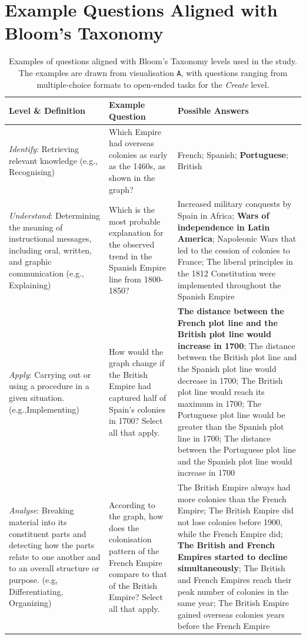 \newpage
\appendix
\onecolumn

\section{Example Questions Aligned with Bloom's Taxonomy}
\label{sec:appendix-questions}

\begin{table}[h!]
\centering
\small
\caption{Examples of questions aligned with Bloom's Taxonomy levels used in the study. The examples are drawn from visualisation \texttt{A}, with questions ranging from multiple-choice formats to open-ended tasks for the \textit{Create} level.}
\begin{tabular}{p{3.4cm}p{4.4cm}p{6.5cm}}
\toprule
\textbf{Level \& Definition} & \textbf{Example Question} & \textbf{Possible Answers} \\ 
\midrule
\textit{Identify}: Retrieving relevant knowledge (e.g., Recognising) &Which Empire had overseas colonies as early as the 1460s, as shown in the graph? & French; Spanish; \textbf{Portuguese}; British \\ 
\midrule
\textit{Understand}: Determining the meaning of instructional messages, including oral, written, and graphic communication (e.g., Explaining) & Which is the most probable explanation for the observed trend in the Spanish Empire line from 1800-1850? & Increased military conquests by Spain in Africa; \textbf{Wars of independence in Latin America}; Napoleonic Wars that led to the cession of colonies to France; The liberal principles in the 1812 Constitution were implemented throughout the Spanish Empire \\ 
\midrule
\textit{Apply}: Carrying out or using a procedure in a given situation. (e.g.,Implementing) & How would the graph change if the British Empire had captured half of Spain's colonies in 1700? Select all that apply. & \textbf{The distance between the French plot line and the British plot line would increase in 1700}; The distance between the British plot line and the Spanish plot line would decrease in 1700; The British plot line would reach its maximum in 1700; The Portuguese plot line would be greater than the Spanish plot line in 1700; The distance between the Portuguese plot line and the Spanish plot line would increase in 1700 \\ 
\midrule
\textit{Analyse}: Breaking material into its constituent parts and detecting how the parts relate to one another and to an overall structure or purpose. (e.g, Differentiating, Organizing)&According to the graph, how does the colonisation pattern of the French Empire compare to that of the British Empire? Select all that apply. & The British Empire always had more colonies than the French Empire; The British Empire did not lose colonies before 1900, while the French Empire did; \textbf{The British and French Empires started to decline simultaneously}; The British and French Empires reach their peak number of colonies in the same year; The British Empire gained overseas colonies years before the French Empire \\ 

\end{tabular}
\end{table}
